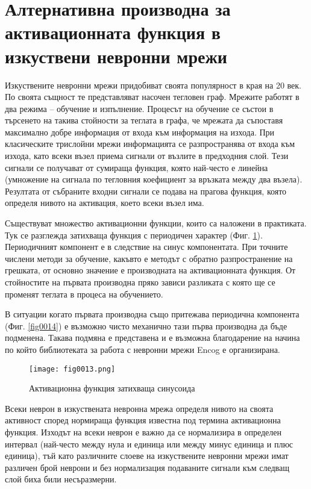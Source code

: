 \section{Алтернативна производна за активационната функция в изкуствени невронни мрежи}

Изкуствените невронни мрежи придобиват своята популярност в края на 20 век. По своята същност те представляват насочен тегловен граф. Мрежите работят в два режима – обучение и изпълнение. Процесът на обучение се състои в търсенето на такива стойности за теглата в графа, че мрежата да съпоставя максимално добре информация от входа към информация на изхода. При класическите трислойни мрежи информацията се разпространява от входа към изхода, като всеки възел приема сигнали от възлите в предходния слой. Тези сигнали се получават от сумираща функция, която най-често е линейна (умножение на сигнала по тегловния коефициент за връзката между два възела). Резултата от събраните входни сигнали се подава на прагова функция, която определя нивото на активация, което всеки възел има.

Съществуват множество активационни функции, които са наложени в практиката. Тук се разглежда затихваща функция с периодичен характер (Фиг. \ref{fig0013}). Периодичният компонент е в следствие на синус компонентата. При точните числени методи за обучение, какъвто е методът с обратно разпространение на грешката, от основно значение е производната на активационната функция. От стойностите на първата производна пряко зависи разликата с която ще се променят теглата в процеса на обучението.

В ситуации когато първата производна също притежава периодична компонента (Фиг. \ref{fig0014}) е възможно чисто механично тази първа производна да бъде подменена. Такава подмяна е представена и е възможна благодарение на начина по който библиотеката за работа с невронни мрежи Encog е организирана.

\begin{figure}[H]
  \centering
  \texttt{[image: fig0013.png]}
  \caption{Активационна функция затихваща синусоида}
\label{fig0013}
\end{figure}

Всеки неврон в изкуствената невронна мрежа определя нивото на своята активност според нормираща функция известна под термина активационна функция. Изходът на всеки неврон е важно да се нормализира в определен интервал (най-често между нула и единица или между минус единица и плюс единица), тъй като различните слоеве на изкуствените невронни мрежи имат различен брой неврони и без нормализация подаваните сигнали към следващ слой биха били несъразмерни.

